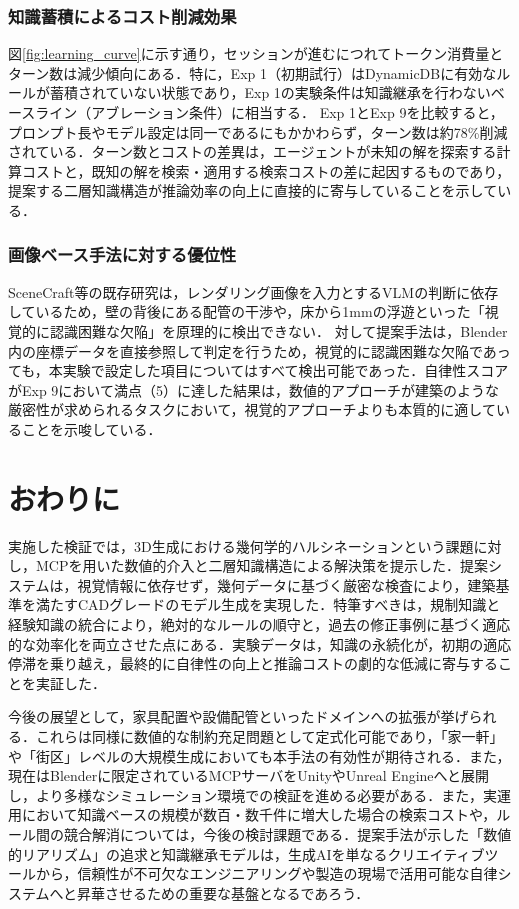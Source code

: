 \documentclass[dvipdfmx, a4paper, 9pt]{deimj}
\begin{document}
\subsubsection{知識蓄積によるコスト削減効果}
図\ref{fig:learning_curve}に示す通り，セッションが進むにつれてトークン消費量とターン数は減少傾向にある．特に，Exp 1（初期試行）はDynamicDBに有効なルールが蓄積されていない状態であり，Exp 1の実験条件は知識継承を行わないベースライン（アブレーション条件）に相当する．
Exp 1とExp 9を比較すると，プロンプト長やモデル設定は同一であるにもかかわらず，ターン数は約78\%削減されている．ターン数とコストの差異は，エージェントが未知の解を探索する計算コストと，既知の解を検索・適用する検索コストの差に起因するものであり，提案する二層知識構造が推論効率の向上に直接的に寄与していることを示している．

\subsubsection{画像ベース手法に対する優位性}
SceneCraft等の既存研究は，レンダリング画像を入力とするVLMの判断に依存しているため，壁の背後にある配管の干渉や，床から1mmの浮遊といった「視覚的に認識困難な欠陥」を原理的に検出できない．
対して提案手法は，Blender内の座標データを直接参照して判定を行うため，視覚的に認識困難な欠陥であっても，本実験で設定した項目についてはすべて検出可能であった．自律性スコアがExp 9において満点（5）に達した結果は，数値的アプローチが建築のような厳密性が求められるタスクにおいて，視覚的アプローチよりも本質的に適していることを示唆している．

\section{おわりに}

実施した検証では，3D生成における幾何学的ハルシネーションという課題に対し，MCPを用いた数値的介入と二層知識構造による解決策を提示した．提案システムは，視覚情報に依存せず，幾何データに基づく厳密な検査により，建築基準を満たすCADグレードのモデル生成を実現した．特筆すべきは，規制知識と経験知識の統合により，絶対的なルールの順守と，過去の修正事例に基づく適応的な効率化を両立させた点にある．実験データは，知識の永続化が，初期の適応停滞を乗り越え，最終的に自律性の向上と推論コストの劇的な低減に寄与することを実証した．

今後の展望として，家具配置や設備配管といったドメインへの拡張が挙げられる．これらは同様に数値的な制約充足問題として定式化可能であり，「家一軒」や「街区」レベルの大規模生成においても本手法の有効性が期待される．また，現在はBlenderに限定されているMCPサーバをUnityやUnreal Engineへと展開し，より多様なシミュレーション環境での検証を進める必要がある．また，実運用において知識ベースの規模が数百・数千件に増大した場合の検索コストや，ルール間の競合解消については，今後の検討課題である．提案手法が示した「数値的リアリズム」の追求と知識継承モデルは，生成AIを単なるクリエイティブツールから，信頼性が不可欠なエンジニアリングや製造の現場で活用可能な自律システムへと昇華させるための重要な基盤となるであろう．




\end{document}

